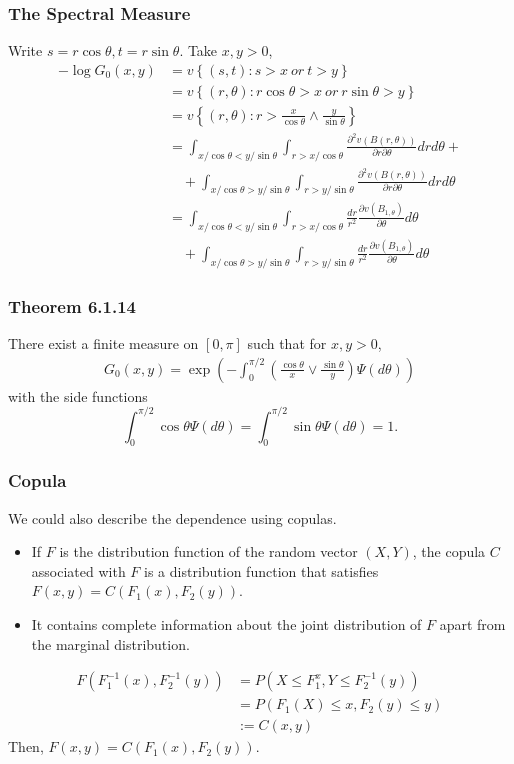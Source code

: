 \documentclass{beamer}
\newcommand{\suit}[1]{\left(#1\right)}
\newcommand{\set}[1]{\left\{#1\right\}}
\begin{document}
\begin{frame}
    \frametitle{The Spectral Measure}
Write $s=r\cos \theta, t=r\sin \theta$. Take $x,y>0$,
$$
\begin{aligned}
    -\log G_0(x,y) & = v\set{(s,t): s>x \ or \ t>y}\\
                & = v\set{(r,\theta):r\cos \theta>x \ or \ r\sin \theta >y} \\
                & = v \set{(r,\theta): r> \frac{x}{\cos\theta} \land \frac{y}{\sin \theta}} \\
                & =\int_{x/\cos\theta< y/\sin \theta} \int_{r>x/\cos\theta} \frac{\partial^2 v(B(r,\theta))}{\partial r \partial \theta} dr d\theta+ \\
                &\quad + \int_{x/\cos\theta> y/\sin \theta} \int_{r>y/\sin \theta} \frac{\partial^2 v(B(r,\theta))}{\partial r \partial \theta} dr d\theta\\
                & =\int_{x/\cos\theta< y/\sin \theta} \int_{r>x/\cos\theta} \frac{dr}{r^2}\frac{\partial v(B_{1,\theta})}{\partial \theta}d\theta\\
                &\quad +\int_{x/\cos\theta> y/\sin \theta} \int_{r>y/\sin \theta}  \frac{dr}{r^2}\frac{\partial v(B_{1,\theta})}{\partial \theta}d\theta
\end{aligned}
  $$  
\end{frame}

\begin{frame}
    \frametitle{Theorem 6.1.14}
There exist a finite measure on $[0,\pi]$ such that for $x,y>0$,
$$
\begin{aligned}
    G_0(x,y)=\exp\suit{-\int_0^{\pi/2}\suit{\frac{\cos \theta}{x}\lor \frac{\sin \theta}{y}}\Psi(d \theta)}
\end{aligned}
$$
with the side functions
$$
\int_{0}^{\pi/2}\cos \theta \Psi(d\theta)=\int_{0}^{\pi/2}\sin \theta \Psi(d\theta)=1.
$$
    

\end{frame}



\begin{frame}
    \frametitle{Copula}
We could also describe the dependence using copulas.
\bigskip
\begin{itemize}
    \item If $F$ is the distribution function of the random vector $(X,Y)$, the copula $C$ associated with $F$ is a distribution function that satisfies $F(x,y)=C(F_1(x),F_2(y))$.
    \item It contains complete information about the joint distribution of $F$ apart from the marginal distribution.
\end{itemize}

$$
\begin{aligned}
    F(F_1^{-1}(x),F_2^{-1}(y))& =P(X\le F_1^{x}, Y\le F_2^{-1}(y))\\
    &=P(F_1(X)\le x, F_2(y)\le y)\\
    &:=C(x,y)
\end{aligned}
$$
Then, $F(x,y)=C(F_1(x),F_2(y))$.
\end{frame}
\end{document}
